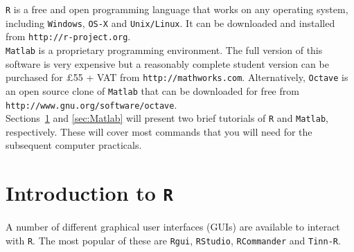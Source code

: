 \documentclass{book}
\begin{document}
\texttt{R} is a free and open programming language that works on any
operating system, including \texttt{Windows}, \texttt{OS-X} and
\texttt{Unix/Linux}. It can be downloaded and installed from
\texttt{http://r-project.org}.\\

\texttt{Matlab} is a proprietary programming environment. The full
version of this software is very expensive but a reasonably complete
student version can be purchased for $\pounds$55 + VAT from
\texttt{http://mathworks.com}. Alternatively, \texttt{Octave} is an
open source clone of \texttt{Matlab} that can be downloaded for free
from \texttt{http://www.gnu.org/software/octave}.\\

Sections~\ref{sec:R} and \ref{sec:Matlab} will present two brief
tutorials of \texttt{R} and \texttt{Matlab}, respectively.  These will
cover most commands that you will need for the subsequent computer
practicals.

\section{Introduction to \texttt{R}}
\label{sec:R}

A number of different graphical user interfaces (GUIs) are available
to interact with \texttt{R}. The most popular of these are
\texttt{Rgui}, \texttt{RStudio}, \texttt{RCommander} and
\texttt{Tinn-R}.
\end{document}
